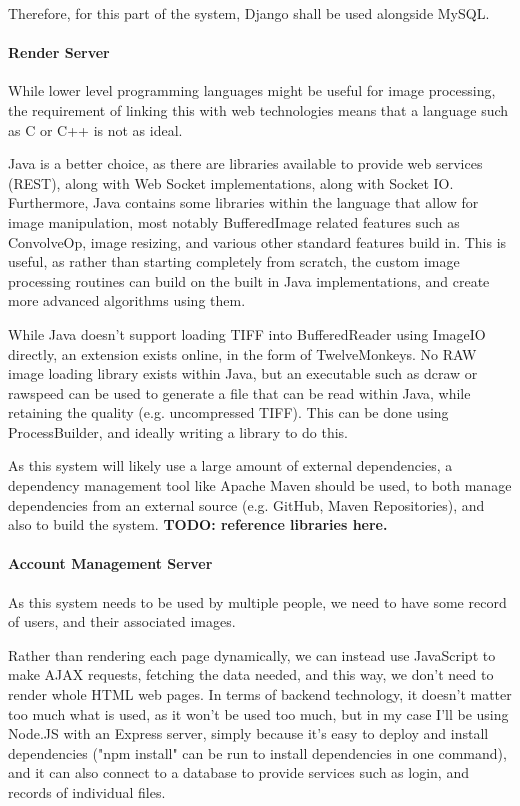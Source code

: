 \documentclass[12pt,a4paper]{article}
\begin{document}
 Therefore, for this part of the system, Django shall be used alongside MySQL.
\paragraph{Render Server}
While lower level programming languages might be useful for image processing,
the requirement of linking this with web technologies means that a language such as C
or C++ is not as ideal.

Java is a better choice, as there are libraries available to provide web services (REST),
along with Web Socket implementations, along with Socket IO. Furthermore, Java contains
some libraries within the language that allow for image manipulation, most notably
BufferedImage related features such as ConvolveOp, image resizing, and various other standard
features build in. This is useful, as rather than starting completely from scratch, the custom
image processing routines can build on the built in Java implementations, and create more advanced
algorithms using them.

While Java doesn't support loading TIFF into BufferedReader using ImageIO directly,
an extension exists online, in the form of TwelveMonkeys. No RAW image loading library
exists within Java, but an executable such as dcraw or rawspeed can be used to generate a file
that can be read within Java, while retaining the quality (e.g. uncompressed TIFF). This can be done
using ProcessBuilder, and ideally writing a library to do this.

As this system will likely use a large amount of external dependencies, a dependency management tool
like Apache Maven should be used, to both manage dependencies from an external source (e.g. GitHub, Maven
Repositories), and also to build the system.
\textbf{TODO: reference libraries here.}

\paragraph{Account Management Server}
As this system needs to be used by multiple people, we need to have some record of users,
and their associated images.

Rather than rendering each page dynamically, we can instead use JavaScript to make AJAX requests,
fetching the data needed, and this way, we don't need to render whole HTML web pages. In terms of
backend technology, it doesn't matter too much what is used, as it won't be used too much, but
in my case I'll be using Node.JS with an Express server, simply because it's easy to deploy and
install dependencies ("npm install" can be run to install dependencies in one command), and it can
also connect to a database to provide services such as login, and records of individual files.
\end{document}
